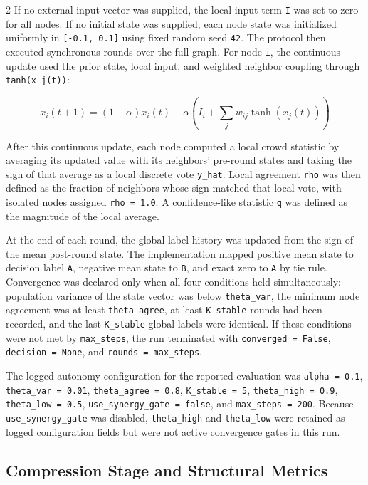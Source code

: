 \documentclass[fleqn,10pt,letterpaper]{article}
\begin{document}
\begin{multicols}{2}
If no external input vector was supplied, the local input term \texttt{I} was set to zero for all nodes. If no initial state was supplied, each node state was initialized uniformly in \texttt{[-0.1, 0.1]} using fixed random seed \texttt{42}. The protocol then executed synchronous rounds over the full graph. For node \texttt{i}, the continuous update used the prior state, local input, and weighted neighbor coupling through \texttt{tanh(x\_j(t))}:

\begin{equation}
x_i(t+1) = (1-\alpha)x_i(t) + \alpha \left( I_i + \sum_j w_{ij}\tanh(x_j(t)) \right)
\label{eq:autonomy_update}
\end{equation}

After this continuous update, each node computed a local crowd statistic by averaging its updated value with its neighbors' pre-round states and taking the sign of that average as a local discrete vote \texttt{y\_hat}. Local agreement \texttt{rho} was then defined as the fraction of neighbors whose sign matched that local vote, with isolated nodes assigned \texttt{rho = 1.0}. A confidence-like statistic \texttt{q} was defined as the magnitude of the local average.

At the end of each round, the global label history was updated from the sign of the mean post-round state. The implementation mapped positive mean state to decision label \texttt{A}, negative mean state to \texttt{B}, and exact zero to \texttt{A} by tie rule. Convergence was declared only when all four conditions held simultaneously: population variance of the state vector was below \texttt{theta\_var}, the minimum node agreement was at least \texttt{theta\_agree}, at least \texttt{K\_stable} rounds had been recorded, and the last \texttt{K\_stable} global labels were identical. If these conditions were not met by \texttt{max\_steps}, the run terminated with \texttt{converged = False}, \texttt{decision = None}, and \texttt{rounds = max\_steps}.

The logged autonomy configuration for the reported evaluation was \texttt{alpha = 0.1}, \texttt{theta\_var = 0.01}, \texttt{theta\_agree = 0.8}, \texttt{K\_stable = 5}, \texttt{theta\_high = 0.9}, \texttt{theta\_low = 0.5}, \texttt{use\_synergy\_gate = false}, and \texttt{max\_steps = 200}. Because \texttt{use\_synergy\_gate} was disabled, \texttt{theta\_high} and \texttt{theta\_low} were retained as logged configuration fields but were not active convergence gates in this run.


\subsection{Compression Stage and Structural Metrics}


\end{multicols}
\end{document}
